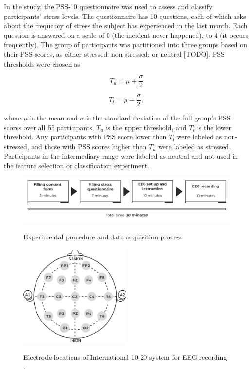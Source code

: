 \documentclass[pdflatex,sn-mathphys]{sn-jnl}%
\theoremstyle{thmstyleone}%
\theoremstyle{thmstyletwo}%
\theoremstyle{thmstylethree}%
\begin{document}
In the study, the PSS-10 questionnaire was used to assess and classify participants' stress levels. The questionnaire has 10 questions, each of which asks about the frequency of stress the subject has experienced in the last month. Each question is answered on a scale of 0 (the incident never happened), to 4 (it occurs frequently). The group of participants was partitioned into three groups based on their PSS scores, as either stressed, non-stressed, or neutral [TODO]. PSS thresholds were chosen as

\begin{equation} \label{eq:1}
   T_{u} =\mu + \frac{\sigma}{2}
\end{equation}

\begin{equation} \label{eq:2}
   T_{l} =\mu - \frac{\sigma}{2},
\end{equation}

where $\mu$ is the mean and $\sigma$ is the standard deviation of the full group's PSS scores over all 55 participants, $T_{u}$ is the upper threshold, and $T_{l}$ is the lower threshold. Any participants with PSS score lower than $T_{l}$ were labeled as non-stressed, and those with PSS scores higher than $T_{u}$ were labeled as stressed. Participants in the intermediary range were labeled as neutral and not used in the feature selection or classification experiment.

\begin{figure}[h!]
  \centering
  \caption{Experimental procedure and data acquisition process}
  \includegraphics[width=1\textwidth]{Experimentalprocedure.png}
  \label{fig:procedure}
\end{figure}

\begin{figure}[h!]
 \centering
  \caption{Electrode locations of International 10-20 system for EEG recording \cite{wiki:10-20}.}
  \includegraphics[width=0.5\textwidth]{Electrodeplacement.png}
  \label{fig:activeelectrode}
\end{figure}
\end{document}
